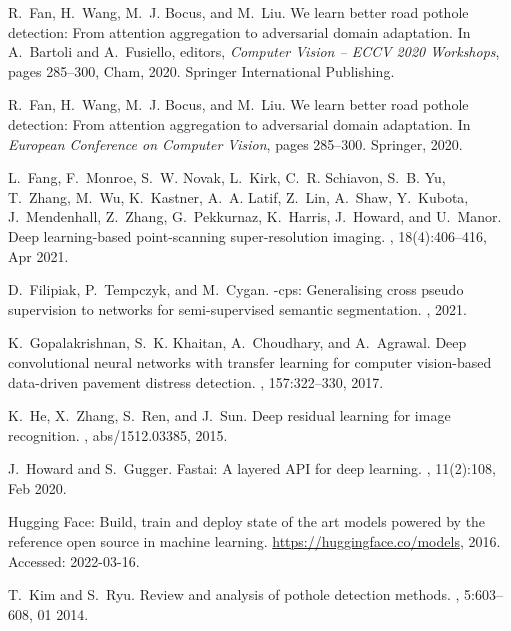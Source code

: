 \documentclass[twocolumn]{article}
\begin{document}
\begin{thebibliography}{10}
R.~Fan, H.~Wang, M.~J. Bocus, and M.~Liu.
\newblock We learn better road pothole detection: From attention aggregation to
  adversarial domain adaptation.
\newblock In A.~Bartoli and A.~Fusiello, editors, {\em Computer Vision -- ECCV
  2020 Workshops}, pages 285--300, Cham, 2020. Springer International
  Publishing.

R.~Fan, H.~Wang, M.~J. Bocus, and M.~Liu.
\newblock We learn better road pothole detection: From attention aggregation to
  adversarial domain adaptation.
\newblock In {\em European Conference on Computer Vision}, pages 285--300.
  Springer, 2020.

L.~Fang, F.~Monroe, S.~W. Novak, L.~Kirk, C.~R. Schiavon, S.~B. Yu, T.~Zhang,
  M.~Wu, K.~Kastner, A.~A. Latif, Z.~Lin, A.~Shaw, Y.~Kubota, J.~Mendenhall,
  Z.~Zhang, G.~Pekkurnaz, K.~Harris, J.~Howard, and U.~Manor.
\newblock Deep learning-based point-scanning super-resolution imaging.
, 18(4):406--416, Apr 2021.

D.~Filipiak, P.~Tempczyk, and M.~Cygan.
\newblock -cps: Generalising cross pseudo supervision to  networks
  for semi-supervised semantic segmentation.
, 2021.

K.~Gopalakrishnan, S.~K. Khaitan, A.~Choudhary, and A.~Agrawal.
\newblock Deep convolutional neural networks with transfer learning for
  computer vision-based data-driven pavement distress detection.
, 157:322--330, 2017.

K.~He, X.~Zhang, S.~Ren, and J.~Sun.
\newblock Deep residual learning for image recognition.
, abs/1512.03385, 2015.

J.~Howard and S.~Gugger.
\newblock Fastai: {A} layered {API} for deep learning.
, 11(2):108, Feb 2020.

{Hugging Face}: Build, train and deploy state of the art models powered by the
  reference open source in machine learning.
\newblock \url{https://huggingface.co/models}, 2016.
\newblock Accessed: 2022-03-16.

T.~Kim and S.~Ryu.
\newblock Review and analysis of pothole detection methods.
, 5:603--608, 01 2014.


\end{thebibliography}
\end{document}
